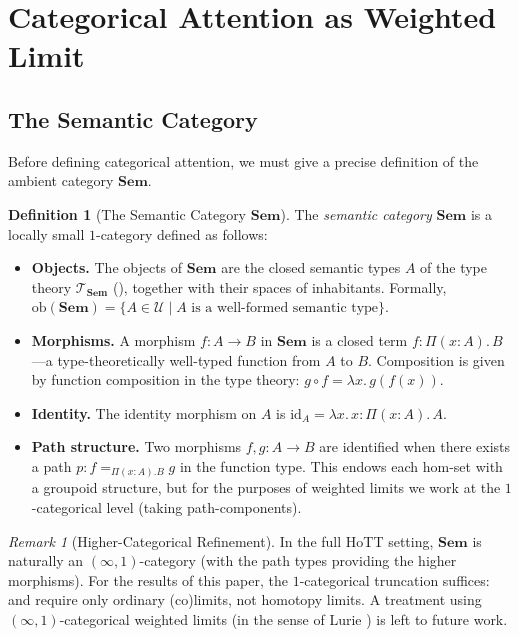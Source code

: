\documentclass[11pt,a4paper]{article}
\theoremstyle{plain}
\theoremstyle{definition}
\newtheorem{definition}[theorem]{Definition}
\theoremstyle{remark}
\newtheorem{remark}[theorem]{Remark}
\newcommand{\Sem}{\mathbf{Sem}}
\newcommand{\imark}{\mathrm{id}}
\newcommand{\ob}{\mathrm{ob}}
\begin{document}
\section{Categorical Attention as Weighted Limit}\label{sec:attention}

\subsection{The Semantic Category}\label{subsec:sem-cat}

Before defining categorical attention, we must give a precise definition of the ambient category $\Sem$.

\begin{definition}[The Semantic Category $\Sem$]\label{def:sem-category}
The \emph{semantic category} $\Sem$ is a locally small $1$-category defined as follows:
\begin{itemize}[nosep]
  \item \textbf{Objects.} The objects of $\Sem$ are the closed semantic types $A$ of the type theory $\mathcal{T}_{\Sem}$ (), together with their spaces of inhabitants.
  Formally, $\ob(\Sem) = \{A \in \mathcal{U} \mid A \text{ is a well-formed semantic type}\}$.
  \item \textbf{Morphisms.} A morphism $f : A \to B$ in $\Sem$ is a closed term $f : \Pi(x : A).\, B$---a type-theoretically well-typed function from $A$ to $B$.
  Composition is given by function composition in the type theory: $g \circ f = \lambda x.\, g(f(x))$.
  \item \textbf{Identity.} The identity morphism on $A$ is $\imark_A = \lambda x.\, x : \Pi(x:A).\, A$.
  \item \textbf{Path structure.} Two morphisms $f, g : A \to B$ are identified when there exists a path $p : f =_{\Pi(x:A).B} g$ in the function type.
  This endows each hom-set with a groupoid structure, but for the purposes of weighted limits we work at the $1$-categorical level (taking path-components).
\end{itemize}
\end{definition}

\begin{remark}[Higher-Categorical Refinement]\label{rem:higher-sem}
In the full HoTT setting, $\Sem$ is naturally an $(\infty,1)$-category (with the path types providing the higher morphisms).
For the results of this paper, the $1$-categorical truncation suffices:  and  require only ordinary (co)limits, not homotopy limits.
A treatment using $(\infty,1)$-categorical weighted limits (in the sense of Lurie \cite{lurie2009}) is left to future work.
\end{remark}
\end{document}
